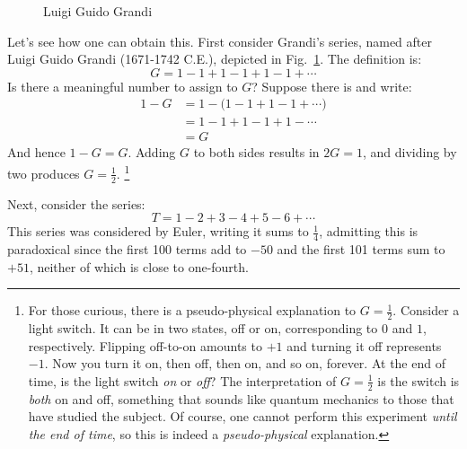 \begin{example}
\begin{figure}
            \caption{Luigi Guido Grandi}
            \label{photo:guido_grandi}
        \end{figure}
        Let's see how one can obtain this. First consider Grandi's
        series, named after Luigi Guido Grandi%
         (1671-1742 C.E.), depicted in
        Fig.~\ref{photo:guido_grandi}. The definition is:
        \begin{equation}
            G=1-1+1-1+1-1+\cdots
        \end{equation}
        Is there a meaningful number to assign to $G$? Suppose there is and
        write:
        \begin{subequations}
            \begin{align}
                1-G&=1-\big(1-1+1-1+\cdots)\\
                &=1-1+1-1+1-\cdots\\
                &=G
            \end{align}
        \end{subequations}
        And hence $1-G=G$. Adding $G$ to both sides results in $2G=1$,
        and dividing by two produces $G=\frac{1}{2}$.%
        \footnote{%
            For those curious,
            there is a pseudo-physical explanation to $G=\frac{1}{2}$. Consider
            a light switch. It can be in two states, off or on, corresponding to
            $0$ and $1$, respectively. Flipping off-to-on amounts to $+1$ and
            turning it off represents $\minus{1}$. Now you turn it on, then off,
            then on, and so on, forever. At the end of time, is the light switch
            \textit{on} or \textit{off}? The interpretation of $G=\frac{1}{2}$ is
            the switch is \textit{both} on and off, something that sounds like
            quantum mechanics to those that have studied the subject. Of course,
            one cannot perform this experiment \textit{until the end of time},
            so this is indeed a \textit{pseudo-physical} explanation.
        }
        \par\hfill\par
        Next, consider the series:
        \begin{equation}
            T=1-2+3-4+5-6+\cdots
        \end{equation}
        This series was considered by Euler, writing it sums to
        $\frac{1}{4}$, admitting this is paradoxical since the first
        100 terms add to $\minus{50}$ and the first 101 terms sum to $+51$,
        neither of which is close to one-fourth.%

\end{example}
